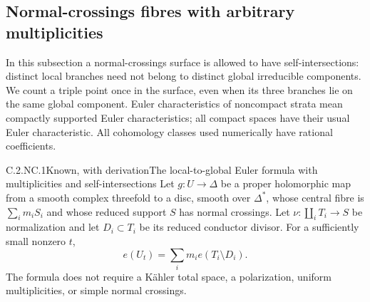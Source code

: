 \subsection{Normal-crossings fibres with arbitrary multiplicities}

In this subsection a normal-crossings surface is allowed to have self-intersections: distinct local branches need not belong to distinct global irreducible components. We count a triple point once in the surface, even when its three branches lie on the same global component. Euler characteristics of noncompact strata mean compactly supported Euler characteristics; all compact spaces have their usual Euler characteristic. All cohomology classes used numerically have rational coefficients.

\begin{statement}{C.2.NC.1}{Known, with derivation}{The local-to-global Euler formula with multiplicities and self-intersections}
Let $g:U\to\Delta$ be a proper holomorphic map from a smooth complex threefold to a disc, smooth over $\Delta^*$, whose central fibre is $\sum_i m_iS_i$ and whose reduced support $S$ has normal crossings. Let $\nu:\coprod_i T_i\to S$ be normalization and let $D_i\subset T_i$ be its reduced conductor divisor. For a sufficiently small nonzero $t$,
\[
 e(U_t)=\sum_i m_i e(T_i\setminus D_i).
 \tag{C.NC.1}
\]
The formula does not require a Kähler total space, a polarization, uniform multiplicities, or simple normal crossings.
\end{statement}
